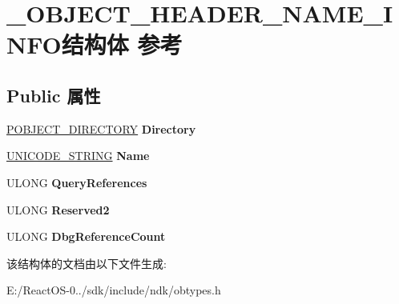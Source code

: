 \hypertarget{struct___o_b_j_e_c_t___h_e_a_d_e_r___n_a_m_e___i_n_f_o}{}\section{\+\_\+\+O\+B\+J\+E\+C\+T\+\_\+\+H\+E\+A\+D\+E\+R\+\_\+\+N\+A\+M\+E\+\_\+\+I\+N\+F\+O结构体 参考}
\label{struct___o_b_j_e_c_t___h_e_a_d_e_r___n_a_m_e___i_n_f_o}
\subsection*{Public 属性}
\begin{DoxyCompactItemize}
\item 
\mbox{\label{struct___o_b_j_e_c_t___h_e_a_d_e_r___n_a_m_e___i_n_f_o_a360e373fe70508478a59cf2fa01064f9}} 
\hyperlink{struct___o_b_j_e_c_t___d_i_r_e_c_t_o_r_y}{P\+O\+B\+J\+E\+C\+T\+\_\+\+D\+I\+R\+E\+C\+T\+O\+RY} {\bfseries Directory}
\item 
\mbox{\label{struct___o_b_j_e_c_t___h_e_a_d_e_r___n_a_m_e___i_n_f_o_a581d86df910235c9b0bccd7f6080c860}} 
\hyperlink{struct___u_n_i_c_o_d_e___s_t_r_i_n_g}{U\+N\+I\+C\+O\+D\+E\+\_\+\+S\+T\+R\+I\+NG} {\bfseries Name}
\item 
\mbox{\label{struct___o_b_j_e_c_t___h_e_a_d_e_r___n_a_m_e___i_n_f_o_a5c7f84cf88770710c7b5fe720df957a1}} 
U\+L\+O\+NG {\bfseries Query\+References}
\item 
\mbox{\label{struct___o_b_j_e_c_t___h_e_a_d_e_r___n_a_m_e___i_n_f_o_a581278113554509404c7a3c3d1f334d7}} 
U\+L\+O\+NG {\bfseries Reserved2}
\item 
\mbox{\label{struct___o_b_j_e_c_t___h_e_a_d_e_r___n_a_m_e___i_n_f_o_a53ef3d1f48e4cb0583ca224a7ab30bee}} 
U\+L\+O\+NG {\bfseries Dbg\+Reference\+Count}
\end{DoxyCompactItemize}


该结构体的文档由以下文件生成\+:\begin{DoxyCompactItemize}
\item 
E\+:/\+React\+O\+S-\/0../sdk/include/ndk/obtypes.\+h\end{DoxyCompactItemize}

